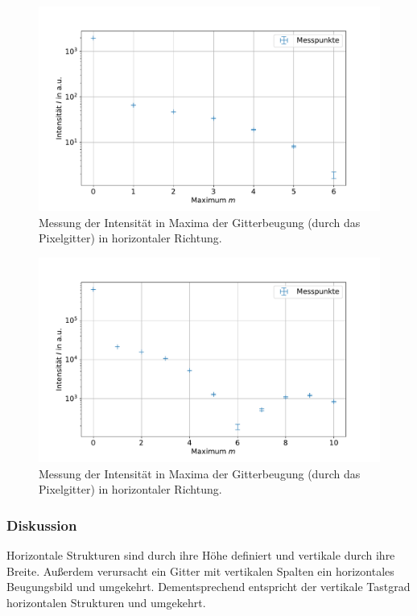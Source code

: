 \documentclass[
	a4paper,
	12pt,
	pagesize,
	ngerman
]{scrartcl}
\begin{document}
\begin{figure}[H]
			\includegraphics[width=0.8\linewidth]{img/sinc2}
			\caption{
			Messung der Intensität in Maxima der Gitterbeugung (durch das Pixelgitter) in horizontaler Richtung.
			}
			\label{fig_sinc2}
	\end{figure}

\begin{figure}[H] %
			\includegraphics[width=0.8\linewidth]{img/sinc3}
			\caption{
			Messung der Intensität in Maxima der Gitterbeugung (durch das Pixelgitter) in horizontaler Richtung.\protect\footnotemark
			}
			\label{fig_sinc3}
	\end{figure}


			\subsubsection*{Diskussion}
			Horizontale Strukturen sind durch ihre Höhe definiert und vertikale durch ihre Breite.
			Außerdem verursacht ein Gitter mit vertikalen Spalten ein horizontales Beugungsbild und umgekehrt.
			Dementsprechend entspricht der vertikale Tastgrad horizontalen Strukturen und umgekehrt.
\end{document}
